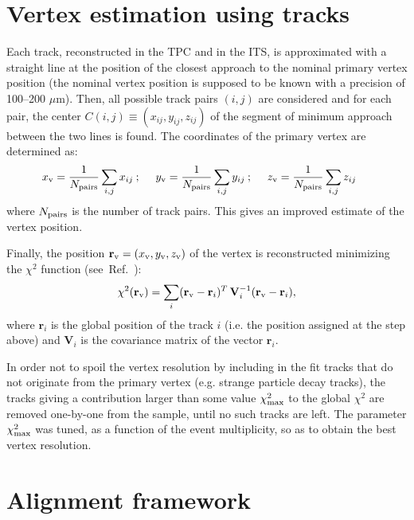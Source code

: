 \documentclass[12pt,a4paper,twoside]{article}
\begin{document}
{\begin{itemize}
\end{itemize}

\section{Vertex estimation using tracks}\label{VertexerTracks}

Each track, reconstructed in the TPC and in the ITS,
is approximated with a straight line at the
position of the closest approach to the nominal primary vertex position
(the nominal vertex position is supposed to be known with a precision
of 100--200 $\mu$m). 
Then, all possible 
track pairs $(i,j)$ are considered and for each pair, the center 
$C(i,j)\equiv(x_{ij},y_{ij},z_{ij})$ of the segment of minimum approach 
between the two lines is found. The coordinates of the primary vertex 
are determined as:
\[
x_{\rm v}=\frac{1}{N_{\rm pairs}}\sum_{i,j}x_{ij}\:; \:\:\:\:\:\:
y_{\rm v}=\frac{1}{N_{\rm pairs}}\sum_{i,j}y_{ij}\:; \:\:\:\:\:\:
z_{\rm v}=\frac{1}{N_{\rm pairs}}\sum_{i,j}z_{ij} \:\:\:\:\:\:
\]
where $N_{\rm pairs}$ is the number of track pairs.
This gives an improved estimate of the vertex position.

Finally, the position $\textbf{r}_{\rm v}=(x_{\rm v},y_{\rm v},z_{\rm v})$ of the 
vertex is reconstructed minimizing the 
$\chi^2$ function (see~Ref.~\cite{VERTEX:cmsvtxnote}):  
\begin{equation}
  \label{eq:chi2}
  \chi^2(\textbf{r}_{\rm v})=\sum_i (\textbf{r}_{\rm v}-\textbf{r}_i)^T\,{\bf
    V}_i^{-1}(\textbf{r}_{\rm v}-\textbf{r}_i),
\end{equation}
where $\textbf{r}_i$ is the global position of the 
track $i$ (i.e. the position assigned at the step above) 
and $\textbf{V}_i$ is the covariance matrix of the vector $\textbf{r}_i$.

In order not to spoil the vertex resolution by including in the fit tracks that
do not originate from the primary vertex (e.g. strange particle
decay tracks), the tracks giving a
contribution larger than some value $\chi^2_{\rm max}$ to the global $\chi^2$
are removed one-by-one from the sample, until no such tracks are left. The
parameter $\chi^2_{\rm max}$ was tuned,
as a function of the event multiplicity, so as to obtain the best vertex
resolution.
\newpage
\section{Alignment framework}
}
\end{document}
